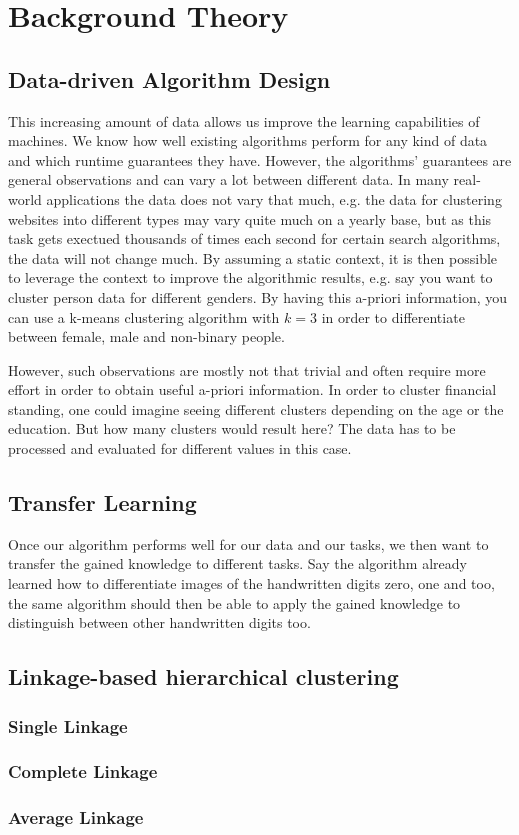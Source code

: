 \chapter{Background Theory}
\label{chapter:background}

\section{Data-driven Algorithm Design}

This increasing amount of data allows us improve the learning capabilities of machines. We know how well existing algorithms perform for any kind of data and which runtime guarantees they have. However, the algorithms' guarantees are general observations and can vary a lot between different data. In many real-world applications the data does not vary that much, e.g. the data for clustering websites into different types may vary quite much on a yearly base, but as this task gets exectued thousands of times each second for certain search algorithms, the data will not change much. By assuming a static context, it is then possible to leverage the context to improve the algorithmic results, e.g. say you want to cluster person data for different genders. By having this a-priori information, you can use a k-means clustering algorithm with $k = 3$ in order to differentiate between female, male and non-binary people.

However, such observations are mostly not that trivial and often require more effort in order to obtain useful a-priori information. In order to cluster financial standing, one could imagine seeing different clusters depending on the age or the education. But how many clusters would result here? The data has to be processed and evaluated for different values in this case.

\section{Transfer Learning}

Once our algorithm performs well for our data and our tasks, we then want to transfer the gained knowledge to different tasks. Say the algorithm already learned how to differentiate images of the handwritten digits zero, one and too, the same algorithm should then be able to apply the gained knowledge to distinguish between other handwritten digits too.

\section{Linkage-based hierarchical clustering}

\subsection{Single Linkage}

\subsection{Complete Linkage}

\subsection{Average Linkage}